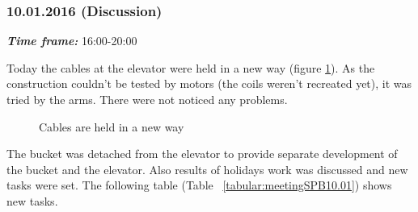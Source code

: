 \subsubsection{10.01.2016 (Discussion)}
\textit{\textbf{Time frame:}} 16:00-20:00 

Today the cables at the elevator were held in a new way (figure \ref{Elevator3.3}). As the construction couldn't be tested by motors (the coils weren't recreated yet), it was tried by the arms. There were not noticed any problems.

\begin{figure}[H]
	\begin{minipage}[h]{1\linewidth}
		\caption{Cables are held in a new way}
		\label{Elevator3.3}
	\end{minipage}
\end{figure}

The bucket was detached from the elevator to provide separate development of the bucket and the elevator.
Also results of holidays work was discussed and new tasks were set. The following table (Table ~\ref{tabular:meetingSPB10.01}) shows new tasks.


